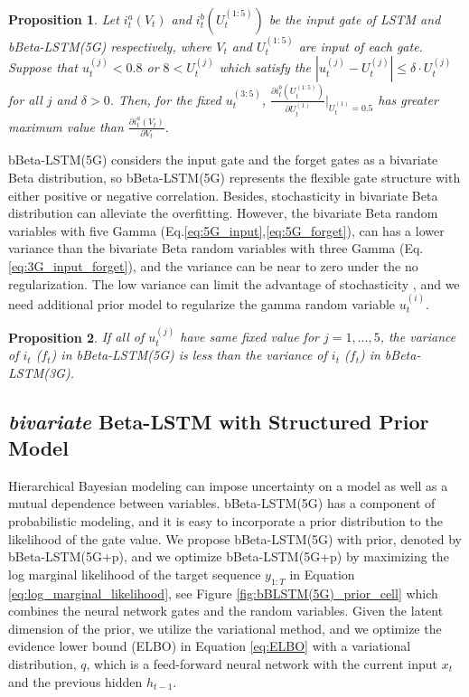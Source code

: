 \documentclass[letterpaper]{article} %
\newtheorem{proposition}{Proposition}
\begin{document}
\begin{proposition}
Let $i_{t}^{a}(V_{t})$ and $i_{t}^{b}(U_{t}^{(1:5)})$ be the input gate of LSTM and bBeta-LSTM(5G) respectively, where $V_{t}$ and $U_{t}^{(1:5)}$ are input of each gate. Suppose that $u_{t}^{(j)}<0.8$ or $8<U_{t}^{(j)}$ which satisfy the $|u_{t}^{(j)}-U_{t}^{(j)}|\leq \delta \cdot U_{t}^{(j)}$ for all $j$ and $\delta>0$. Then, for the fixed $u_{t}^{(3:5)}$, $\frac{\partial i_{t}^{b}(U_{t}^{(1:5)})}{\partial U_{t}^{(1)}}|_{U_{t}^{(1)}=0.5}$ has greater maximum value than $\frac{\partial i_{t}^{a}(V_{t})}{\partial V_{t}}$.
\end{proposition}

bBeta-LSTM(5G) considers the input gate and the forget gates as a bivariate Beta distribution, so bBeta-LSTM(5G) represents the flexible gate structure with either positive or negative correlation. Besides, stochasticity in bivariate Beta distribution can alleviate the overfitting. However, the bivariate Beta random variables with five Gamma (Eq.\ref{eq:5G_input},\ref{eq:5G_forget}), can has a lower variance than the bivariate Beta random variables with three Gamma (Eq.\ref{eq:3G_input_forget}), and the variance can be near to zero under the no regularization.  The low variance can limit the advantage of stochasticity \cite{dieng2018noisin}, and we need additional prior model to regularize the gamma random variable $u_{t}^{(i)}$.

\begin{proposition}
	If all of $u_{t}^{(j)}$ have same fixed value for $j=1,...,5$, the variance of $i_{t}$ ($f_{t}$) in bBeta-LSTM(5G) is less than the variance of $i_{t}$ ($f_{t}$) in bBeta-LSTM(3G).
\end{proposition}

\subsection{\textit{bivariate} Beta-LSTM with Structured Prior Model}
Hierarchical Bayesian modeling can impose uncertainty on a model as well as a mutual dependence between variables. %
bBeta-LSTM(5G) has a component of probabilistic modeling, and it is easy to incorporate a prior distribution to the likelihood of the gate value.  We propose bBeta-LSTM(5G) with prior, denoted by bBeta-LSTM(5G+p), and we optimize bBeta-LSTM(5G+p) by maximizing the log marginal likelihood of the target sequence $y_{1:T}$ in Equation  \ref{eq:log_marginal_likelihood}, see Figure \ref{fig:bBLSTM(5G)_prior_cell} which combines the neural network gates and the random variables.
Given the latent dimension of the prior, we utilize the variational method, and we optimize the evidence lower bound (ELBO) \cite{VAE2014} in Equation \ref{eq:ELBO} with a variational distribution, $q$, which is a feed-forward neural network with the current input $x_{t}$ and the previous hidden $h_{t-1}$.
\end{document}
